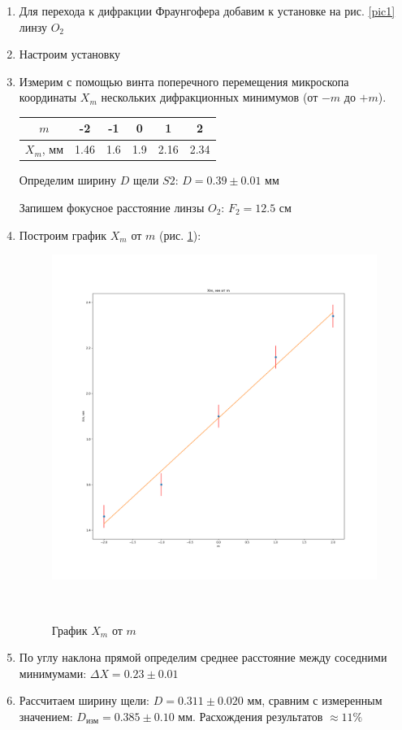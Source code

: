 \documentclass[a4paper, 12pt]{article}
\begin{document}
\begin{enumerate}
    \item Для перехода к дифракции Фраунгофера добавим к установке на рис. \ref{pic1} линзу $O_2$
    \item Настроим установку
    \item Измерим с помощью винта поперечного перемещения микроскопа координаты $X_m$ нескольких дифракционных минимумов (от $-m$ до $+m$).
    
    \begin{tabular}{|c|c|c|c|c|c|} \hline
        $m$ & -2 & -1 & 0 & 1 & 2 \\ \hline
        $X_m$, мм & 1.46 & 1.6 & 1.9 & 2.16 & 2.34 \\ \hline 
    \end{tabular}

    Определим ширину $D$ щели $S2$: $D = 0.39 \pm 0.01$ мм

    Запишем фокусное расстояние линзы $O_2$: $F_2 = 12.5$ см

    \item Построим график $X_m$ от $m$ (рис. \ref{graph2}):
    
    \begin{figure}[!h]
        \centering
        \includegraphics[scale=0.4]{graph2.png}
        \caption{График $X_m$ от $m$}\
        \label{graph2}
    \end{figure}

    \item По углу наклона прямой определим среднее расстояние между соседними минимумами: $\Delta X = 0.23 \pm 0.01$
    \item Рассчитаем ширину щели: $D = 0.311 \pm 0.020$ мм, сравним с измеренным значением: $D_{изм} = 0.385 \pm 0.10$ мм. Расхождения результатов $\approx 11 \%$
\end{enumerate}
\end{document}
